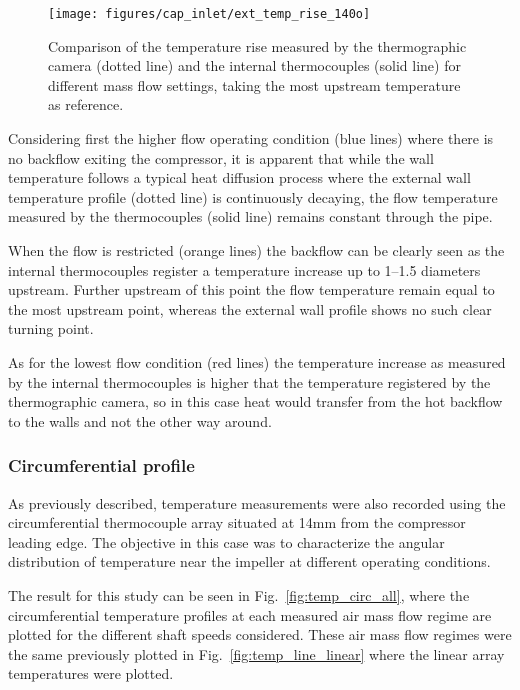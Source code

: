 \begin{figure}[!hbt]
\centering
\texttt{[image: figures/cap\_inlet/ext\_temp\_rise\_140o]}
\caption[Comparison of external vs. internal temperatures]{Comparison of the temperature rise measured by the thermographic camera (dotted line) and the internal thermocouples (solid line) for different mass flow settings, taking the most upstream temperature as reference.}
\label{fig:temp_ext_comp}
\end{figure}

Considering first the higher flow operating condition (blue lines) where there is no backflow exiting the compressor, it is apparent that while the wall temperature follows a typical heat diffusion process where the external wall temperature profile (dotted line) is continuously decaying, the flow temperature measured by the thermocouples (solid line) remains constant through the pipe.

When the flow is restricted (orange lines) the backflow can be clearly seen as the internal thermocouples register a temperature increase up to 1--1.5 diameters upstream. Further upstream of this point the flow temperature remain equal to the most upstream point, whereas the external wall profile shows no such clear turning point.

As for the lowest flow condition (red lines) the temperature increase as measured by the internal thermocouples is higher that the temperature registered by the thermographic camera, so in this case heat would transfer from the hot backflow to the walls and not the other way around.

\subsubsection{Circumferential profile}

As previously described, temperature measurements were also recorded using the circumferential thermocouple array situated at 14mm from the compressor leading edge. The objective in this case was to characterize the angular distribution of temperature near the impeller at different operating conditions.

The result for this study can be seen in Fig.~\ref{fig:temp_circ_all}, where the circumferential temperature profiles at each measured air mass flow regime are plotted for the different shaft speeds considered. These air mass flow regimes were the same previously plotted in Fig.~\ref{fig:temp_line_linear} where the linear array temperatures were plotted.

